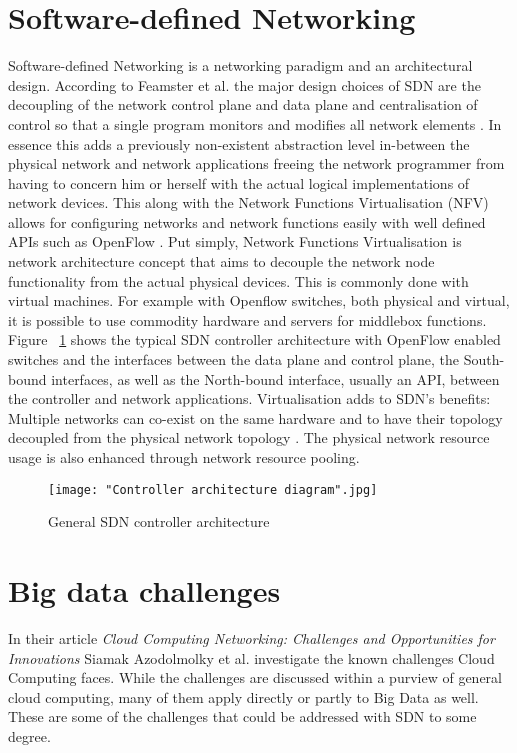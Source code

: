 \documentclass{acm_proc_article-sp}
\begin{document}
\section{Software-defined Networking}

Software-defined Networking is a networking paradigm and an architectural design. According to Feamster et al. the major design choices of SDN are the decoupling of the network control plane and data plane and centralisation of control so that a single program monitors and modifies all network elements \cite{Feamster:2013:RS:2559899.2560327}. In essence this adds a previously non-existent abstraction level in-between the physical network and network applications freeing the network programmer from having to concern him or herself with the actual logical implementations of network devices. This along with the Network Functions Virtualisation (NFV) allows for configuring networks and network functions easily with well defined APIs such as OpenFlow \cite{McKeown-CCR2008}. Put simply, Network Functions Virtualisation is network architecture concept that aims to decouple the network node functionality from the actual physical devices. This is commonly done with virtual machines. For example with Openflow switches, both physical and virtual, it is possible to use commodity hardware and servers for middlebox functions. Figure ~\ref{fig:architecture} shows the typical SDN controller architecture with OpenFlow enabled switches and the interfaces between the data plane and control plane, the South-bound interfaces, as well as the North-bound interface, usually an API, between the controller and network applications. Virtualisation adds to SDN's benefits: Multiple networks can co-exist on the same hardware and to have their topology decoupled from the physical network topology \cite{Azodolmolky}. The physical network resource usage is also enhanced through network resource pooling. 

\begin{figure}[ht!]
\centering
{}
\texttt{[image: "Controller architecture diagram".jpg]}
\caption{General SDN controller architecture}
\label{fig:architecture}
\end{figure} 




\section{Big data challenges}

In their article \textit{Cloud Computing Networking: Challenges and Opportunities for Innovations} \cite{Azodolmolky} Siamak Azodolmolky et al. investigate the known challenges Cloud Computing faces. While the challenges are discussed within a purview of general cloud computing, many of them apply directly or partly to Big Data as well. These are some of the challenges that could be addressed with SDN to some degree.
\end{document}

